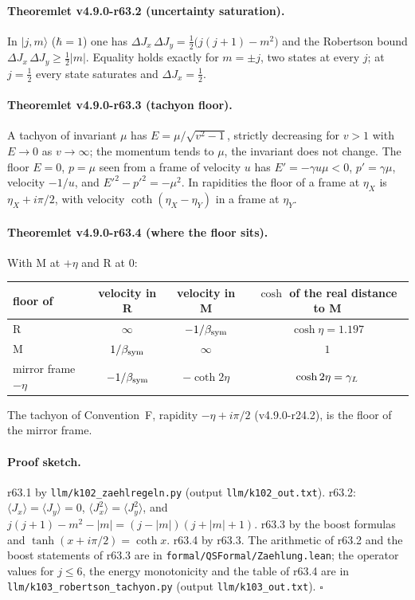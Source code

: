 \paragraph{Theoremlet v4.9.0-r63.2 (uncertainty saturation).}
In \(|j,m\rangle\) (\(\hbar=1\)) one has \(\Delta J_x\,\Delta J_y=\tfrac12\bigl(j(j+1)-m^2\bigr)\) and the Robertson bound \(\Delta J_x\,\Delta J_y\ge\tfrac12|m|\).  Equality holds
exactly for \(m=\pm j\), two states at every \(j\); at \(j=\tfrac12\) every state saturates and \(\Delta J_x=\tfrac12\).

\paragraph{Theoremlet v4.9.0-r63.3 (tachyon floor).}
A tachyon of invariant \(\mu\) has \(E=\mu/\sqrt{v^2-1}\), strictly decreasing for \(v>1\) with \(E\to0\) as \(v\to\infty\); the momentum tends to \(\mu\), the invariant does not
change.  The floor \(E=0\), \(p=\mu\) seen from a frame of velocity \(u\) has \(E'=-\gamma u\mu<0\), \(p'=\gamma\mu\), velocity \(-1/u\), and \(E'^2-p'^2=-\mu^2\).  In rapidities the
floor of a frame at \(\eta_X\) is \(\eta_X+i\pi/2\), with velocity \(\coth(\eta_X-\eta_Y)\) in a frame at \(\eta_Y\).

\paragraph{Theoremlet v4.9.0-r63.4 (where the floor sits).}
With M at \(+\eta\) and R at \(0\):
\begin{center}
\small
\begin{tabular}{@{}lccc@{}}
\toprule
floor of & velocity in R & velocity in M & \(\cosh\) of the real distance to M\\
\midrule
R & \(\infty\) & \(-1/\beta_{\mathrm{sym}}\) & \(\cosh\eta=1.197\)\\
M & \(1/\beta_{\mathrm{sym}}\) & \(\infty\) & \(1\)\\
mirror frame \(-\eta\) & \(-1/\beta_{\mathrm{sym}}\) & \(-\coth2\eta\) & \(\cosh2\eta=\gamma_L\)\\
\bottomrule
\end{tabular}
\end{center}
The tachyon of Convention~F, rapidity \(-\eta+i\pi/2\) (v4.9.0-r24.2), is the floor of the mirror frame.

\paragraph{Proof sketch.}
r63.1 by \texttt{llm/k102\_zaehlregeln.py} (output \texttt{llm/k102\_out.txt}).  r63.2: \(\langle J_x\rangle=\langle J_y\rangle=0\), \(\langle J_x^2\rangle=\langle J_y^2\rangle\), and
\(j(j+1)-m^2-|m|=(j-|m|)(j+|m|+1)\).  r63.3 by the boost formulas and \(\tanh(x+i\pi/2)=\coth x\).  r63.4 by r63.3.  The arithmetic of r63.2 and the boost statements of r63.3
are in \texttt{formal/QSFormal/Zaehlung.lean}; the operator values for \(j\le6\), the energy monotonicity and the table of r63.4 are in \texttt{llm/k103\_robertson\_tachyon.py}
(output \texttt{llm/k103\_out.txt}).  \(\square\)

